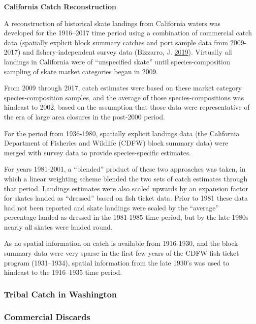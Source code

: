 \documentclass[12pt,]{article}
\begin{document}
\textbf{California Catch Reconstruction}

A reconstruction of historical skate landings from California waters was
developed for the 1916--2017 time period using a combination of
commercial catch data (spatially explicit block summary catches and port
sample data from 2009-2017) and fishery-independent survey data
(Bizzarro, J. \protect\hyperlink{ref-Bizzarro2019}{2019}). Virtually all
landings in California were of ``unspecified skate'' until
species-composition sampling of skate market categories began in 2009.

From 2009 through 2017, catch estimates were based on these market
category species-composition samples, and the average of those
species-compositions was hindcast to 2002, based on the assumption that
those data were representative of the era of large area closures in the
post-2000 period.

For the period from 1936-1980, spatially explicit landings data (the
California Department of Fisheries and Wildlife (CDFW) block summary
data) were merged with survey data to provide species-specific
estimates.

For years 1981-2001, a ``blended'' product of these two approaches was
taken, in which a linear weighting scheme blended the two sets of catch
estimates through that period. Landings estimates were also scaled
upwards by an expansion factor for skates landed as ``dressed'' based on
fish ticket data. Prior to 1981 these data had not been reported and
skate landings were scaled by the ``average'' percentage landed as
dressed in the 1981-1985 time period, but by the late 1980s nearly all
skates were landed round.

As no spatial information on catch is available from 1916-1930, and the
block summary data were very sparse in the first few years of the CDFW
fish ticket program (1931--1934), spatial information from the late
1930's was used to hindcast to the 1916--1935 time period.

\hypertarget{tribal-catch-in-washington}{%
\subsubsection{Tribal Catch in
Washington}\label{tribal-catch-in-washington}}

\hypertarget{commercial-discards}{%
\subsubsection{Commercial Discards}\label{commercial-discards}}
\end{document}
